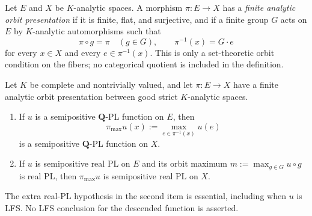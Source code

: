 
\begin{definition}
\label{def:p031-finite-analytic-orbit-presentation}
Let $E$ and $X$ be $K$-analytic spaces.  A morphism
$\pi:E\to X$ has a \emph{finite analytic orbit presentation} if it is
finite, flat, and surjective, and if a finite group $G$ acts on $E$ by
$K$-analytic automorphisms such that
\begin{equation}
\label{eq:p031-action-over-base}
              \pi\circ g=\pi\quad(g\in G),
              \qquad
              \pi^{-1}(x)=G\cdot e
\end{equation}
for every $x\in X$ and every $e\in\pi^{-1}(x)$.  This is only a
set-theoretic orbit condition on the fibers; no categorical quotient is
included in the definition.
\end{definition}

\begin{theorem}
\label{thm:p031-orbit-fiber-maximum}
Let $K$ be complete and nontrivially valued, and let
$\pi:E\to X$ have a finite analytic orbit presentation between good strict
$K$-analytic spaces.
\begin{enumerate}
\item If $u$ is a semipositive $\mathbf Q$-PL function on $E$, then
\begin{equation}
\label{eq:p031-rational-fiber-maximum}
       \pi_{\max}u(x):=\max_{e\in\pi^{-1}(x)}u(e)
\end{equation}
is a semipositive $\mathbf Q$-PL function on $X$.
\item If $u$ is semipositive real PL on $E$ and its orbit maximum
$m:=\max_{g\in G}u\circ g$ is real PL, then $\pi_{\max}u$ is
semipositive real PL on $X$.
\end{enumerate}
The extra real-PL hypothesis in the second item is essential, including
when $u$ is LFS. No LFS conclusion for the descended function is asserted.
\end{theorem}

